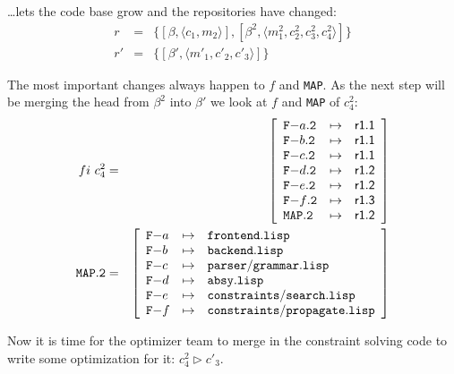 \documentclass[fleqn, 10pt, a4paper]{report}
\begin{document}
\ldots lets the code base grow and the repositories have changed:
\begin{eqnarray*}
r &=& \{[\beta, \langle c_1, m_2\rangle], [\beta^2, \langle m_1^2, c_2^2,
c_3^2, c_4^2\rangle]\} \\
r' &=& \{[\beta', \langle m'_1, c'_2, c'_3\rangle]\}
\end{eqnarray*}

The most important changes always happen to $f$ and \texttt{MAP}.
As the next step will be merging the head from $\beta^2$ into $\beta'$
we look at $f$ and \texttt{MAP} of $c_4^2$:
\begin{eqnarray*}
\mathnormal{fi}\ c_4^2 &=& \left[
\begin{array}{lcl}
\mathtt{F-}a\mathtt{.2} & \mapsto & \mathsf{r1.1} \\
\mathtt{F-}b\mathtt{.2} & \mapsto & \mathsf{r1.1} \\
\mathtt{F-}c\mathtt{.2} & \mapsto & \mathsf{r1.1} \\
\mathtt{F-}d\mathtt{.2} & \mapsto & \mathsf{r1.2} \\
\mathtt{F-}e\mathtt{.2} & \mapsto & \mathsf{r1.2} \\
\mathtt{F-}f\mathtt{.2} & \mapsto & \mathsf{r1.3} \\
\mathtt{MAP.2}         & \mapsto & \mathsf{r1.2} \\
\end{array}\right] \\
\mathtt{MAP.2} &=& \left[
\begin{array}{lcl}
\mathtt{F-}a &\mapsto& \mathtt{frontend.lisp} \\
\mathtt{F-}b &\mapsto& \mathtt{backend.lisp} \\
\mathtt{F-}c &\mapsto& \mathtt{parser/grammar.lisp} \\
\mathtt{F-}d &\mapsto& \mathtt{absy.lisp} \\
\mathtt{F-}e &\mapsto& \mathtt{constraints/search.lisp} \\
\mathtt{F-}f &\mapsto& \mathtt{constraints/propagate.lisp} \\
\end{array}\right]
\end{eqnarray*}

Now it is time for the optimizer team to merge in the constraint solving
code to write some optimization for it: $c_4^2 \rhd c'_3$.
\end{document}
